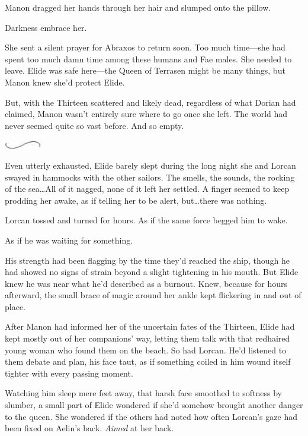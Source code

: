 Manon dragged her hands through her hair and slumped onto the pillow.

Darkness embrace her.

She sent a silent prayer for Abraxos to return soon.
Too much time---she had spent too much damn time among these humans and Fae males.
She needed to leave.
Elide was safe here---the Queen of Terrasen might be many things, but Manon knew she'd protect Elide.

But, with the Thirteen scattered and likely dead, regardless of what Dorian had claimed, Manon wasn't entirely sure where to go once she left.
The world had never seemed quite so vast before.
And so empty.

\begin{center}
	\includegraphics[width=0.65in,height=0.13in]{images/seperator}
\end{center}

Even utterly exhausted, Elide barely slept during the long night she and Lorcan swayed in hammocks with the other sailors.
The smells, the sounds, the rocking of the sea\ldots All of it nagged, none of it left her settled.
A finger seemed to keep prodding her awake, as if telling her to be alert, but\ldots there was nothing.

Lorcan tossed and turned for hours.
As if the same force begged him to wake.

As if he was waiting for something.

His strength had been flagging by the time they'd reached the ship, though he had showed no signs of strain beyond a slight tightening in his mouth.
But Elide knew he was near what he'd described as a burnout.
Knew, because for hours afterward, the small brace of magic around her ankle kept flickering in and out of place.

After Manon had informed her of the uncertain fates of the Thirteen, Elide had kept mostly out of her companions' way, letting them talk with that redhaired young woman who found them on the beach.
So had Lorcan.
He'd listened to them debate and plan, his face taut, as if something coiled in him wound itself tighter with every passing moment.

Watching him sleep mere feet away, that harsh face smoothed to softness by slumber, a small part of Elide wondered if she'd somehow brought another danger to the queen.
She wondered if the others had noted how often Lorcan's gaze had been fixed on Aelin's back.
\emph{Aimed} at her back.

